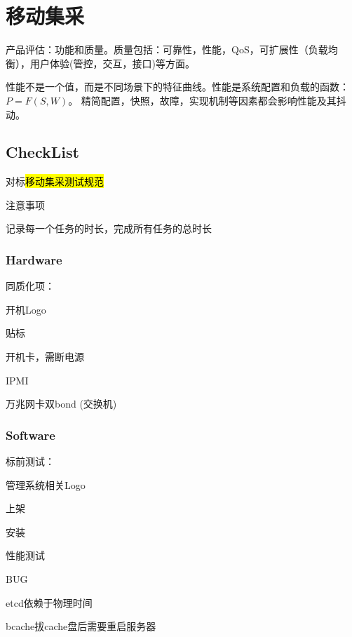\chapter{移动集采}

产品评估：功能和质量。质量包括：可靠性，性能，QoS，可扩展性（负载均衡），用户体验(管控，交互，接口)等方面。

性能不是一个值，而是不同场景下的特征曲线。性能是系统配置和负载的函数：$P=F(S, W)$。
精简配置，快照，故障，实现机制等因素都会影响性能及其抖动。

\section{CheckList}

对标\hl{移动集采测试规范}

注意事项
\begin{enumbox}
\item 记录每一个任务的时长，完成所有任务的总时长
\end{enumbox}

\subsection{Hardware}

同质化项：
\begin{enumbox}
\item 开机Logo
\item 贴标
\item 开机卡，需断电源
\item IPMI
\item 万兆网卡双bond (交换机)
\end{enumbox}

\subsection{Software}

标前测试：
\begin{enumbox}
\item 管理系统相关Logo
\item 上架
\item 安装
\item 性能测试
\end{enumbox}

BUG
\begin{enumbox}
\item etcd依赖于物理时间
\item bcache拔cache盘后需要重启服务器
\end{enumbox}


